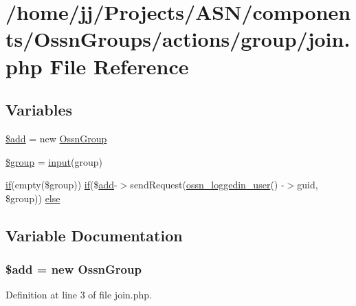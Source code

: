 \hypertarget{join_8php}{}\section{/home/jj/\+Projects/\+A\+S\+N/components/\+Ossn\+Groups/actions/group/join.php File Reference}
\label{join_8php}
\subsection*{Variables}
\begin{DoxyCompactItemize}
\item 
\hyperlink{join_8php_a76aeb354fc71a358526ea9fbd7aae7a4}{\$add} = new \hyperlink{class_ossn_group}{Ossn\+Group}
\item 
\hyperlink{join_8php_ad530a85733b0ec1dc321859fd8faa0dc}{\$group} = \hyperlink{ossn_8lib_8input_8php_a64ebee98b041c4f75f71ed3cd73cc8ed}{input}(\textquotesingle{}group\textquotesingle{})
\item 
\hyperlink{jquery_8tokeninput_8js_ad8dd46a3cbc004569e34401e9e71771a}{if}(empty(\$group)) \hyperlink{jquery_8tokeninput_8js_ad8dd46a3cbc004569e34401e9e71771a}{if}(\$\hyperlink{theme_8min_8js_a79ed6f45c867c160601f70dfa5ec2f95}{add}-\/$>$send\+Request(\hyperlink{ossn_8lib_8users_8php_aa3c8068d0e6638b414d6a2f6c62565b8}{ossn\+\_\+loggedin\+\_\+user}() -\/$>$guid, \$group)) \hyperlink{join_8php_a65076ca057af28da8d90721a0aa29c4b}{else}
\end{DoxyCompactItemize}


\subsection{Variable Documentation}
\subsubsection[{\texorpdfstring{\$add}{$add}}]{\setlength{\rightskip}{0pt plus 5cm}\${\bf add} = new {\bf Ossn\+Group}}\hypertarget{join_8php_a76aeb354fc71a358526ea9fbd7aae7a4}{}\label{join_8php_a76aeb354fc71a358526ea9fbd7aae7a4}


Definition at line 3 of file join.\+php.

